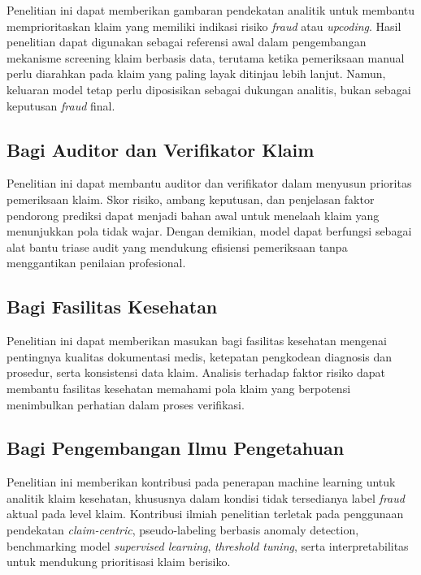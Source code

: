 Penelitian ini dapat memberikan gambaran pendekatan analitik untuk membantu memprioritaskan klaim yang memiliki indikasi risiko \textit{fraud} atau \textit{upcoding}. Hasil penelitian dapat digunakan sebagai referensi awal dalam pengembangan mekanisme screening klaim berbasis data, terutama ketika pemeriksaan manual perlu diarahkan pada klaim yang paling layak ditinjau lebih lanjut. Namun, keluaran model tetap perlu diposisikan sebagai dukungan analitis, bukan sebagai keputusan \textit{fraud} final.

\subsection{Bagi Auditor dan Verifikator Klaim}

Penelitian ini dapat membantu auditor dan verifikator dalam menyusun prioritas pemeriksaan klaim. Skor risiko, ambang keputusan, dan penjelasan faktor pendorong prediksi dapat menjadi bahan awal untuk menelaah klaim yang menunjukkan pola tidak wajar. Dengan demikian, model dapat berfungsi sebagai alat bantu triase audit yang mendukung efisiensi pemeriksaan tanpa menggantikan penilaian profesional.

\subsection{Bagi Fasilitas Kesehatan}

Penelitian ini dapat memberikan masukan bagi fasilitas kesehatan mengenai pentingnya kualitas dokumentasi medis, ketepatan pengkodean diagnosis dan prosedur, serta konsistensi data klaim. Analisis terhadap faktor risiko dapat membantu fasilitas kesehatan memahami pola klaim yang berpotensi menimbulkan perhatian dalam proses verifikasi.

\subsection{Bagi Pengembangan Ilmu Pengetahuan}

Penelitian ini memberikan kontribusi pada penerapan machine learning untuk analitik klaim kesehatan, khususnya dalam kondisi tidak tersedianya label \textit{fraud} aktual pada level klaim. Kontribusi ilmiah penelitian terletak pada penggunaan pendekatan \textit{claim-centric}, pseudo-labeling berbasis anomaly detection, benchmarking model \textit{supervised learning}, \textit{threshold tuning}, serta interpretabilitas untuk mendukung prioritisasi klaim berisiko.

